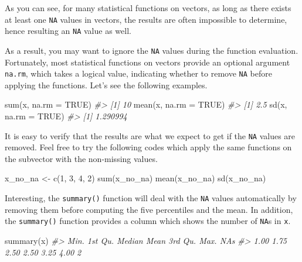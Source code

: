 \documentclass[
]{book}
\newenvironment{Shaded}{\begin{snugshade}}{\end{snugshade}}
\newcommand{\AttributeTok}[1]{\textcolor[rgb]{0.77,0.63,0.00}{#1}}
\newcommand{\CommentTok}[1]{\textcolor[rgb]{0.56,0.35,0.01}{\textit{#1}}}
\newcommand{\ConstantTok}[1]{\textcolor[rgb]{0.00,0.00,0.00}{#1}}
\newcommand{\DecValTok}[1]{\textcolor[rgb]{0.00,0.00,0.81}{#1}}
\newcommand{\FunctionTok}[1]{\textcolor[rgb]{0.00,0.00,0.00}{#1}}
\newcommand{\NormalTok}[1]{#1}
\newcommand{\OtherTok}[1]{\textcolor[rgb]{0.56,0.35,0.01}{#1}}
\begin{document}
As you can see, for many statistical functions on vectors, as long as there exists at least one \texttt{NA} values in vectors, the results are often impossible to determine, hence resulting an \texttt{NA} value as well.

As a result, you may want to ignore the \texttt{NA} values during the function evaluation. Fortunately, most statistical functions on vectors provide an optional argument \texttt{na.rm}, which takes a logical value, indicating whether to remove \texttt{NA} before applying the functions. Let's see the following examples.

\begin{Shaded}
\begin{Highlighting}[]
\FunctionTok{sum}\NormalTok{(x, }\AttributeTok{na.rm =} \ConstantTok{TRUE}\NormalTok{) }
\CommentTok{\#\textgreater{} [1] 10}
\FunctionTok{mean}\NormalTok{(x, }\AttributeTok{na.rm =} \ConstantTok{TRUE}\NormalTok{)}
\CommentTok{\#\textgreater{} [1] 2.5}
\FunctionTok{sd}\NormalTok{(x, }\AttributeTok{na.rm =} \ConstantTok{TRUE}\NormalTok{)}
\CommentTok{\#\textgreater{} [1] 1.290994}
\end{Highlighting}
\end{Shaded}

It is easy to verify that the results are what we expect to get if the \texttt{NA} values are removed. Feel free to try the following codes which apply the same functions on the subvector with the non-missing values.

\begin{Shaded}
\begin{Highlighting}[]
\NormalTok{x\_no\_na }\OtherTok{\textless{}{-}} \FunctionTok{c}\NormalTok{(}\DecValTok{1}\NormalTok{, }\DecValTok{3}\NormalTok{, }\DecValTok{4}\NormalTok{, }\DecValTok{2}\NormalTok{)}
\FunctionTok{sum}\NormalTok{(x\_no\_na) }
\FunctionTok{mean}\NormalTok{(x\_no\_na)}
\FunctionTok{sd}\NormalTok{(x\_no\_na)}
\end{Highlighting}
\end{Shaded}

Interesting, the \texttt{summary()} function will deal with the \texttt{NA} values automatically by removing them before computing the five percentiles and the mean. In addition, the \texttt{summary()} function provides a column which shows the number of \texttt{NA}s in \texttt{x}.

\begin{Shaded}
\begin{Highlighting}[]
\FunctionTok{summary}\NormalTok{(x) }
\CommentTok{\#\textgreater{}    Min. 1st Qu.  Median    Mean 3rd Qu.    Max.    NA\textquotesingle{}s }
\CommentTok{\#\textgreater{}    1.00    1.75    2.50    2.50    3.25    4.00       2}
\end{Highlighting}
\end{Shaded}
\end{document}
